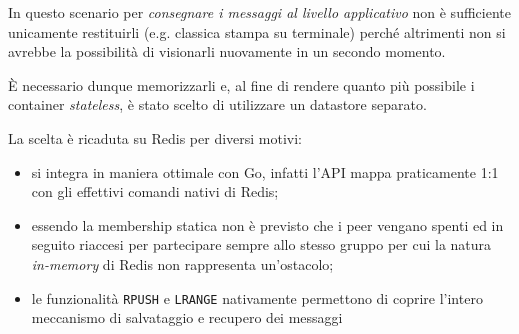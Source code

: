 \documentclass[conference]{IEEEtran}
\begin{document}
In questo scenario per \textit{consegnare i messaggi al livello applicativo} non è sufficiente unicamente restituirli (e.g. classica stampa su terminale) perché altrimenti non si avrebbe la possibilità di visionarli nuovamente in un secondo momento.

È necessario dunque memorizzarli e, al fine di rendere quanto più possibile i container \textit{stateless}, è stato scelto di utilizzare un datastore separato.

La scelta è ricaduta su Redis per diversi motivi:
\begin{itemize}
\item si integra in maniera ottimale con Go, infatti l'API mappa praticamente 1:1 con gli effettivi comandi nativi di Redis;
\item essendo la membership statica non è previsto che i peer vengano spenti ed in seguito riaccesi per partecipare sempre allo stesso gruppo per cui la natura \textit{in-memory} di Redis non rappresenta un'ostacolo;
\item le funzionalità \texttt{RPUSH} e \texttt{LRANGE} nativamente permettono di coprire l'intero meccanismo di salvataggio e recupero dei messaggi
\end{itemize}
\end{document}
